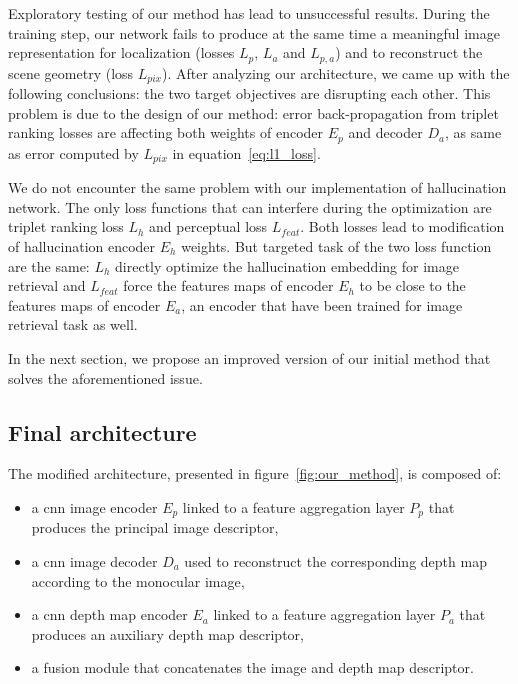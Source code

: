 Exploratory testing of our method has lead to unsuccessful results. During the training step, our network fails to produce at the same time a meaningful image representation for localization (losses $L_p$, $L_a$ and $L_{p,a}$) and to reconstruct the scene geometry (loss $L_{pix}$). After analyzing our architecture, we came up with the following conclusions: the two target objectives are disrupting each other. This problem is due to the design of our method: error back-propagation from triplet ranking losses are affecting both weights of encoder $E_p$ and decoder $D_a$, as same as error computed by $L_{pix}$ in equation~\ref{eq:l1_loss}. 

We do not encounter the same problem with our implementation of hallucination network. The only loss functions that can interfere during the optimization are triplet ranking loss $L_h$ and perceptual loss $L_{feat}$. Both losses lead to modification of hallucination encoder $E_h$ weights. But targeted task of the two loss function are the same: $L_h$ directly optimize the hallucination embedding for image retrieval and $L_{feat}$ force the features maps of encoder $E_h$ to be close to the features maps of encoder $E_a$, an encoder that have been trained for image retrieval task as well.

In the next section, we propose an improved version of our initial method that solves the aforementioned issue.

\subsection{Final architecture}

The modified architecture, presented in figure~\ref{fig:our_method}, is composed of:

\begin{itemize}
	\item a \ac{cnn} image encoder $E_p$ linked to a feature aggregation layer $P_p$ that produces the principal image descriptor,
	\item a \ac{cnn} image decoder $D_a$ used to reconstruct the corresponding depth map according to the monocular image,
	\item a \ac{cnn} depth map encoder $E_a$ linked to a feature aggregation layer $P_a$ that produces an auxiliary depth map descriptor,
	\item a fusion module that concatenates the image and depth map descriptor.
\end{itemize}

